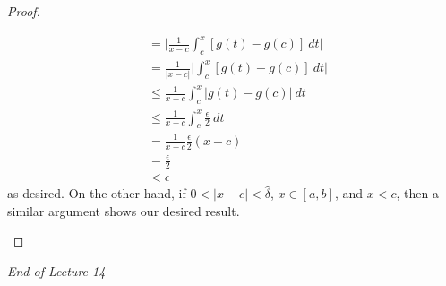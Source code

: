 \begin{proof}
\begin{enumerate}
\begin{enumerate}
\begin{align*}
                        &= \Big| \frac{ 1 }{ x - c  } \int_{ c  }^{  x  } [g(t) - g(c)] \ dt  \Big| \\
                        &= \frac{ 1 }{ | x - c  |  }  \Big| \int_{ c }^{ x }  [g(t) - g(c)] \ dt   \Big|  \\
                        &\leq \frac{ 1 }{ x - c  }  \int_{ c }^{ x }  | g(t) - g(c) |  \ dt \\
                        &\leq \frac{ 1 }{ x - c  }  \int_{ c }^{ x }  \frac{ \epsilon }{ 2 }   \ dt \\
                        &= \frac{ 1 }{ x - c  }  \frac{ \epsilon }{ 2 }  (x - c ) \\
                        &= \frac{ \epsilon }{ 2 }  \\
                        &< \epsilon
                    \end{align*}
                    as desired. On the other hand, if \( 0 < | x - c  |  < \hat{\delta} \), \( x \in [a,b] \), and \( x < c  \), then a similar argument shows our desired result.

            \end{enumerate}
    \end{enumerate}

    \end{proof}

    \begin{center}
        \textit{End of Lecture 14} 
    \end{center}
